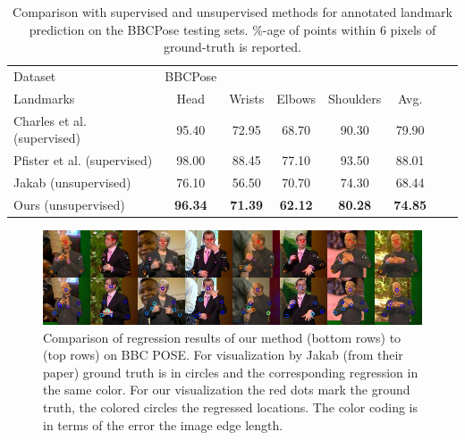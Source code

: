 			\begin{table}[htp]
				\centering
				\begin{tabular}{l|ccccccr}
				\hline
				Dataset & BBCPose &  &  &  & &  &  \\
				Landmarks & {\footnotesize Head} & {\footnotesize Wrists} &  {\footnotesize Elbows }& {\footnotesize Shoulders } & {\footnotesize Avg.}  \\
				\hline
				Charles et al. \cite{charles13bbcpose}  (supervised)&
				95.40 & 72.95 & 68.70 & 90.30 & 79.90  \\
				Pfister et al.  \cite{pfister15flowingconv} (supervised) &
				98.00 & 88.45 & 77.10 & 93.50 & 88.01  \\ \hline
				Jakab \cite{jakab18}  (unsupervised) &
				76.10& 56.50& 70.70& 74.30 &68.44  \\
				Ours (unsupervised)  & \textbf{96.34} & \textbf{71.39} & \textbf{62.12} & \textbf{80.28}& \textbf{74.85} \\
				\hline
				\end{tabular}
				\caption{{Comparison with supervised and unsupervised methods for annotated landmark prediction on the BBCPose testing sets.
				\%-age of points within 6 pixels of ground-truth is reported.}}
				\label{tab:gtregressionhuman}
			\end{table}

			\begin{figure}[htp]
				\centering
				\includegraphics[trim={0cm 0cm 0cm 0cm},clip, width=1.\linewidth]{fig/shape/bbc8}
				\caption{Comparison of regression results of our method (bottom rows) to \cite{jakab18} (top rows) on BBC POSE. For visualization by Jakab \etal (from their paper) ground truth is in circles and the corresponding regression in the same color. For our visualization the red dots mark the ground truth, the colored circles the regressed locations. The color coding is in terms of the error \wrt the image edge length.}
				\label{fig:bbc8}
			\end{figure}



